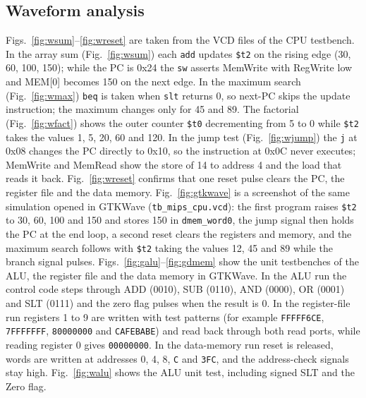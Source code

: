 \documentclass[conference]{IEEEtran}
\begin{document}
\begin{table}[!tbp]
\caption{Program results}
\label{tab:programs}
\centering
\footnotesize
{}
\end{table}

\subsection{Waveform analysis}
Figs.~\ref{fig:wsum}--\ref{fig:wreset} are taken from the VCD files of the CPU
testbench. In the array sum (Fig.~\ref{fig:wsum}) each \texttt{add} updates
\texttt{\$t2} on the rising edge (30, 60, 100, 150); while the PC is 0x24 the
\texttt{sw} asserts MemWrite with RegWrite low and MEM[0] becomes 150 on the
next edge. In the maximum search (Fig.~\ref{fig:wmax}) \texttt{beq} is taken
when \texttt{slt} returns 0, so next-PC skips the update instruction; the
maximum changes only for 45 and 89. The factorial (Fig.~\ref{fig:wfact}) shows
the outer counter \texttt{\$t0} decrementing from 5 to 0 while \texttt{\$t2}
takes the values 1, 5, 20, 60 and 120. In the jump test (Fig.~\ref{fig:wjump})
the \texttt{j} at 0x08 changes the PC directly to 0x10, so the instruction at
0x0C never executes; MemWrite and MemRead show the store of 14 to address 4 and
the load that reads it back. Fig.~\ref{fig:wreset} confirms that one reset
pulse clears the PC, the register file and the data memory. Fig.~\ref{fig:gtkwave} is a screenshot of the same simulation opened in GTKWave
(\texttt{tb\_mips\_cpu.vcd}): the first program raises \texttt{\$t2} to 30, 60,
100 and 150 and stores 150 in \texttt{dmem\_word0}, the jump signal then holds
the PC at the end loop, a second reset clears the registers and memory, and the
maximum search follows with \texttt{\$t2} taking the values 12, 45 and 89 while
the branch signal pulses. Figs.~\ref{fig:galu}--\ref{fig:gdmem} show the unit testbenches of the ALU,
the register file and the data memory in GTKWave. In the ALU run the control
code steps through ADD (0010), SUB (0110), AND (0000), OR (0001) and SLT (0111)
and the zero flag pulses when the result is 0. In the register-file run
registers 1 to 9 are written with test patterns (for example \texttt{FFFFF6CE},
\texttt{7FFFFFFF}, \texttt{80000000} and \texttt{CAFEBABE}) and read back
through both read ports, while reading register 0 gives \texttt{00000000}. In
the data-memory run reset is released, words are written at addresses 0, 4, 8,
\texttt{C} and \texttt{3FC}, and the address-check signals stay high.
Fig.~\ref{fig:walu}
shows the ALU unit test, including signed SLT and the Zero flag.
\end{document}
